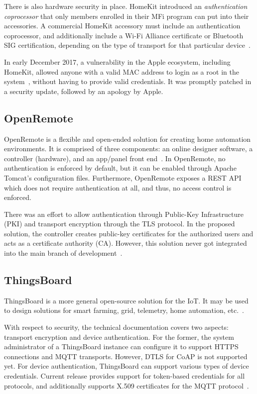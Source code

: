 \documentclass[12pt]{article}
\begin{document}
There is also hardware security in place. HomeKit introduced an \emph{authentication coprocessor} that only members enrolled in their MFi program can put into their accessories. A commercial HomeKit accessory must include an authentication coprocessor, and additionally include a Wi-Fi Alliance certificate or Bluetooth SIG certification, depending on the type of transport for that particular device~\cite{related_02}.

In early December 2017, a vulnerability in the Apple ecosystem, including HomeKit, allowed anyone with a valid MAC address to login as a root in the system~\cite{related_03}, without having to provide valid credentials. It was promptly patched in a security update, followed by an apology by Apple.

\subsection{OpenRemote}

OpenRemote is a flexible and open-ended solution for creating home automation environments. It is comprised of three components: an online designer software, a controller (hardware), and an app/panel front end~\cite{related_04}. In OpenRemote, no authentication is enforced by default, but it can be enabled through Apache Tomcat's configuration files. Furthermore, OpenRemote exposes a REST API which does not require authentication at all, and thus, no access control is enforced.

There was an effort to allow authentication through Public-Key Infrastructure (PKI) and transport encryption through the TLS protocol. In the proposed solution, the controller creates public-key certificates for the authorized users and acts as a certificate authority (CA). However, this solution never got integrated into the main branch of development~\cite{related_05}. 

\subsection{ThingsBoard}

ThingsBoard is a more general open-source solution for the IoT. It may be used to design solutions for smart farming, grid, telemetry, home automation, etc.~\cite{related_06}.

With respect to security, the technical documentation covers two aspects: transport encryption and device authentication. For the former, the system administrator of a ThingsBoard instance can configure it to support HTTPS connections and MQTT transports. However, DTLS for CoAP is not supported yet. For device authentication, ThingsBoard can support various types of device credentials. Current release provides support for token-based credentials for all protocols, and additionally supports X.509 certificates for the MQTT protocol~\cite{related_07}.
\end{document}
